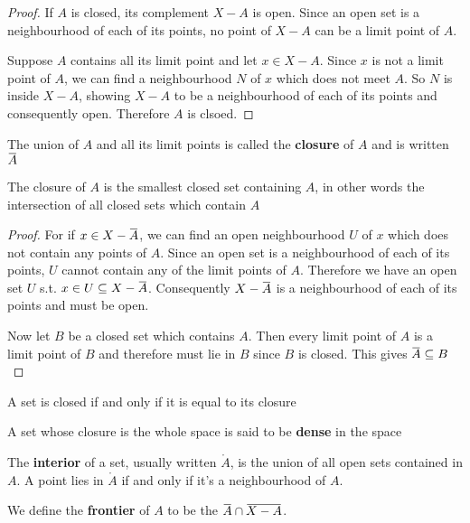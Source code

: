 \documentclass[11pt]{article}
\begin{document}
\begin{proof}
If \(A\) is closed, its complement \(X-A\) is open. Since an open set is a
neighbourhood of each of its points, no point of \(X-A\) can be a limit point
of \(A\).

Suppose \(A\) contains all its limit point and let \(x\in X-A\). Since \(x\)
is not a limit point of \(A\), we can find a neighbourhood \(N\) of \(x\)
which does not meet \(A\). So \(N\) is inside \(X-A\), showing \(X-A\) to be
a neighbourhood of each of its points and consequently open. Therefore \(A\)
is clsoed.
\end{proof}

The union of \(A\) and all its limit points is called the \textbf{closure} of \(A\)
and is written \(\bbar{A}\)

\begin{theorem}[]
The closure of \(A\) is the smallest closed set containing \(A\), in other
words the intersection of all closed sets which contain \(A\)
\end{theorem}

\begin{proof}
For if \(x\in X-\bbar{A}\), we can find an open neighbourhood \(U\) of \(x\)
which does not contain any points of \(A\). Since an open set is a
neighbourhood of each of its points, \(U\) cannot contain any of the limit
points of \(A\). Therefore we have an open set \(U\) s.t.
\(x\in U\subseteq X-\bbar{A}\). Consequently \(X-\bbar{A}\) is a
neighbourhood of each of its points and must be open.

Now let \(B\) be a closed set which contains \(A\). Then every limit point of
\(A\) is a limit point of \(B\) and therefore must lie in \(B\) since \(B\)
is closed. This gives \(\bbar{A}\subseteq B\)
\end{proof}

\begin{corollary}[]
A set is closed if and only if it is equal to its closure
\end{corollary}

A set whose closure is the whole space is said to be \textbf{dense} in the space

The \textbf{interior} of a set, usually written \(\mathring{A}\), is the union of
all open sets contained in \(A\). A point lies in \(\mathring{A}\) if and
only if it's a neighbourhood of \(A\).

We define the \textbf{frontier} of \(A\) to be the \(\bbar{A}\cap\bbar{X-A}\).

\end{document}
